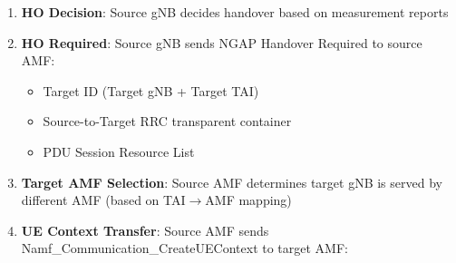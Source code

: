 \begin{enumerate}
\def\labelenumi{\arabic{enumi}.}
\tightlist
\item
  \textbf{HO Decision}: Source gNB decides handover based on measurement reports
\item
  \textbf{HO Required}: Source gNB sends NGAP Handover Required to source AMF:

  \begin{itemize}
  \tightlist
  \item
    Target ID (Target gNB + Target TAI)
  \item
    Source-to-Target RRC transparent container
  \item
    PDU Session Resource List
  \end{itemize}
\item
  \textbf{Target AMF Selection}: Source AMF determines target gNB is served by different AMF (based on TAI\ensuremath{\to}AMF mapping)
\item
  \textbf{UE Context Transfer}: Source AMF sends Namf\_\allowbreak{}Communication\_\allowbreak{}CreateUEContext to target AMF:


\end{enumerate}
